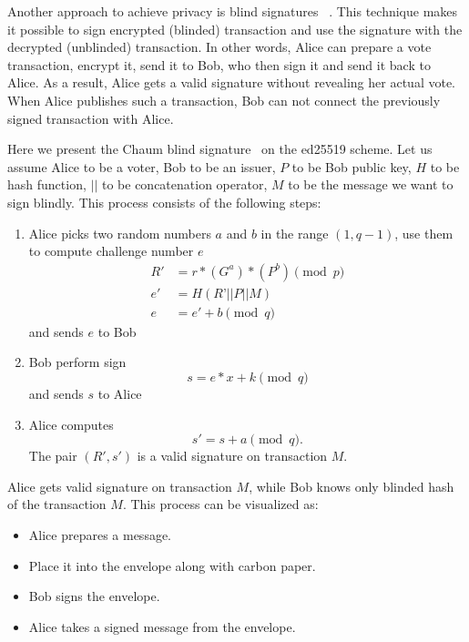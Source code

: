 \documentclass[applsci,article,accept,moreauthors,pdftex]{Definitions/mdpi}
\begin{document}
Another approach to achieve privacy is blind signatures ~\cite{applied_cryptography}. This technique makes it possible to sign encrypted (blinded) transaction and use the signature with the decrypted (unblinded) transaction. In other words, Alice can prepare a vote transaction, encrypt it, send it to Bob, who then sign it and send it back to Alice. As a result, Alice gets a valid signature without revealing her actual vote. When Alice publishes such a transaction, Bob can not connect the previously signed transaction with Alice. 

Here we present the Chaum blind signature~\cite{blindsignatureschaum} on the ed25519 scheme.
Let us assume Alice to be a voter, Bob to be an issuer, $P$ to be Bob public key, $H$ to be hash function, $\vert\vert$ to be concatenation operator, $M$ to be the message we want to sign blindly.
This process consists of the following steps:

\begin{enumerate}

\item Alice picks two random numbers $a$ and $b$ in the range $(1, q-1)$, use them to compute challenge number $e$
\begin{align}
R' &= r*(G^a)*(P^b) \pmod{p} \\
e' &= H(R’|| P || M) \\
e &= e' + b \pmod{q}
\end{align}
and sends $e$ to Bob

\item Bob perform sign
\begin{equation}
s = e*x + k \pmod{q}
\end{equation}
and sends $s$ to Alice

\item Alice computes 
\begin{equation}
s' = s + a \pmod{q}.
\end{equation} The pair $(R', s')$ is a valid signature on transaction $M$.
\end{enumerate}

Alice gets valid signature on transaction $M$, while Bob knows only {blinded hash} of the transaction $M$.
This process can be visualized as:
\begin{itemize}
    \item Alice prepares a message.
    \item Place it into the envelope along with carbon paper.
    \item Bob signs the envelope.
    \item Alice takes a signed message from the envelope.
\end{itemize}
\end{document}
